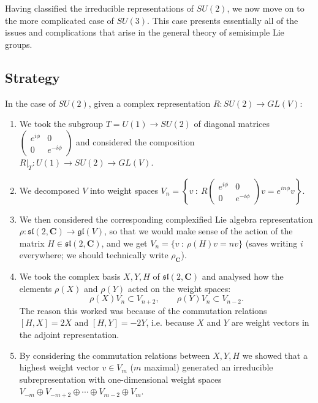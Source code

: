 \documentclass[12pt]{article}
\newcommand{\CC}{\mathbf{C}}
\newcommand{\matr}[4]{\left(\begin{array}{cc}#1 & #2\\ #3 & #4\end{array}\right)}
\theoremstyle{definition}
\theoremstyle{check}
\theoremstyle{remark}
\theoremstyle{TheoremNum}
\begin{document}
Having classified the irreducible representations of $SU(2)$, we now move on to the more complicated case of $SU(3)$. This case presents essentially all of the issues and complications that arise in the general theory of semisimple Lie groups.

\subsection{Strategy}

In the case of $SU(2)$, given a complex representation $R\colon SU(2)\to GL(V)$:
\begin{enumerate}
\item We took the subgroup $T=U(1)\to SU(2)$ of diagonal matrices $\matr{e^{i\phi}}{0}{0}{e^{-i\phi}}$ and considered the composition $R|_T\colon U(1)\to SU(2)\to GL(V)$.
\item We decomposed $V$ into weight spaces $V_n=\left\{v\ :\ R\matr{e^{i\phi}}{0}{0}{e^{-i\phi}}v=e^{in\phi}v\right\}$.
\item We then considered the corresponding complexified Lie algebra representation $\rho\colon\mathfrak{sl}(2,\CC)\to \mathfrak{gl}(V)$, so that we would make sense of the action of the matrix $H\in\mathfrak{sl}(2,\CC)$, and we get $V_n=\{v\ :\ \rho(H)v=nv\}$ (saves writing $i$ everywhere; we should technically write $\rho_{\CC}$).
\item We took the complex basis $X,Y,H$ of $\mathfrak{sl}(2,\CC)$ and analysed how the elements $\rho(X)$ and $\rho(Y)$ acted on the weight spaces:
\[\rho(X)V_n\subset V_{n+2},\qquad\rho(Y)V_n\subset V_{n-2}.\]
The reason this worked was because of the commutation relations $[H,X]=2X$ and $[H,Y]=-2Y$, i.e. because $X$ and $Y$ are weight vectors in the adjoint representation.
\item By considering the commutation relations between $X,Y,H$ we showed that a highest weight vector $v\in V_m$ ($m$ maximal) generated an irreducible subrepresentation with one-dimensional weight spaces $V_{-m}\oplus V_{-m+2}\oplus\cdots\oplus V_{m-2}\oplus V_m$.
\end{enumerate}
\end{document}
